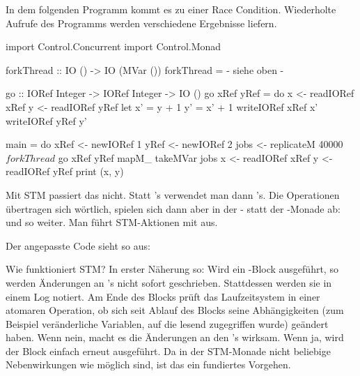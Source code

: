 \documentclass{uebblatt}
\begin{document}
In dem folgenden Programm kommt es zu einer Race Condition. Wiederholte Aufrufe
des Programms werden verschiedene Ergebnisse liefern.

\begin{haskellcode}
import Control.Concurrent
import Control.Monad

forkThread :: IO () -> IO (MVar ())
forkThread = {- siehe oben -}

go :: IORef Integer -> IORef Integer -> IO ()
go xRef yRef = do
    x <- readIORef xRef
    y <- readIORef yRef
    let x' = y  + 1
        y' = x' + 1
    writeIORef xRef x'
    writeIORef yRef y'

main = do
    xRef <- newIORef 1
    yRef <- newIORef 2
    jobs <- replicateM 40000 $ forkThread $ go xRef yRef
    mapM_ takeMVar jobs
    x <- readIORef xRef
    y <- readIORef yRef
    print (x, y)
\end{haskellcode}

Mit STM passiert das nicht. Statt 's verwendet man dann
's. Die Operationen übertragen sich wörtlich, spielen sich
dann aber in der - statt der -Monade ab:
 und so weiter. Man führt
STM-Aktionen mit  aus.

Der angepasste Code sieht so aus:


Wie funktioniert STM? In erster Näherung so: Wird ein
-Block ausgeführt, so werden Änderungen an
's nicht sofort geschrieben. Stattdessen werden sie in
einem Log notiert. Am Ende des Blocks prüft das Laufzeitsystem in einer
atomaren Operation, ob sich seit Ablauf des Blocks seine Abhängigkeiten (zum
Beispiel veränderliche Variablen, auf die lesend zugegriffen wurde) geändert
haben. Wenn nein, macht es die Änderungen an den 's
wirksam. Wenn ja, wird der Block einfach erneut ausgeführt. Da in der
STM-Monade nicht beliebige Nebenwirkungen wie 
möglich sind, ist das ein fundiertes Vorgehen.
\end{document}
